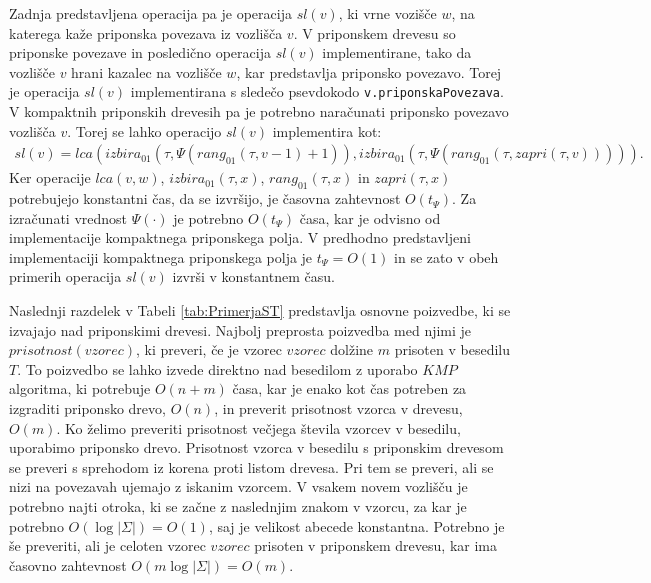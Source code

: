 Zadnja predstavljena operacija pa je operacija $sl(v)$, ki vrne vozišče $w$, na katerega kaže priponska povezava iz vozlišča $v$. V priponskem drevesu so priponske povezave in posledično operacija $sl(v)$ implementirane, tako da vozlišče $v$ hrani kazalec na vozlišče $w$, kar predstavlja priponsko povezavo. Torej je operacija $sl(v)$ implementirana s sledečo psevdokodo \verb|v.priponskaPovezava|. V kompaktnih priponskih drevesih pa je potrebno naračunati priponsko povezavo vozlišča $v$. Torej se lahko operacijo $sl(v)$ implementira kot:
\begin{equation*}
\begin{split}
    sl(v)=lca(izbira_{01}(\tau,\Psi(rang_{01}(\tau,v-1)+1)),izbira_{01}(\tau,\Psi(rang_{01}(\tau,zapri(\tau,v))))).
\end{split}   
\end{equation*}
Ker operacije $lca(v,w)$, $izbira_{01}(\tau,x)$, $rang_{01}(\tau,x)$ in $zapri(\tau,x)$ potrebujejo konstantni čas, da se izvršijo, je časovna zahtevnost $O(t_\Psi)$. Za izračunati vrednost $\Psi(\cdot)$ je potrebno $O(t_\Psi)$ časa, kar je odvisno od implementacije kompaktnega priponskega polja. V predhodno predstavljeni implementaciji kompaktnega priponskega polja je $t_\Psi=O(1)$ in se zato v obeh primerih operacija $sl(v)$ izvrši v konstantnem času.

Naslednji razdelek v Tabeli \ref{tab:PrimerjaST} predstavlja osnovne poizvedbe, ki se izvajajo nad priponskimi drevesi. Najbolj preprosta poizvedba med njimi je $prisotnost(vzorec)$, ki preveri, če je vzorec $vzorec$ dolžine $m$ prisoten v besedilu $T$. To poizvedbo se lahko izvede direktno nad besedilom z uporabo $KMP$ algoritma, ki potrebuje $O(n+m)$ časa, kar je enako kot čas potreben za izgraditi priponsko drevo, $O(n)$, in preverit prisotnost vzorca v drevesu, $O(m)$. Ko želimo preveriti prisotnost večjega števila vzorcev v besedilu, uporabimo priponsko drevo. Prisotnost vzorca v besedilu s priponskim drevesom se preveri s sprehodom iz korena proti listom drevesa. Pri tem se preveri, ali se nizi na povezavah ujemajo z iskanim vzorcem. V vsakem novem vozlišču je potrebno najti otroka, ki se začne z naslednjim znakom v vzorcu, za kar je potrebno $O(\log|\Sigma|)=O(1)$, saj je velikost abecede konstantna. Potrebno je še preveriti, ali je celoten vzorec $vzorec$ prisoten v priponskem drevesu, kar ima časovno zahtevnost $O(m\log|\Sigma|)=O(m)$. 

